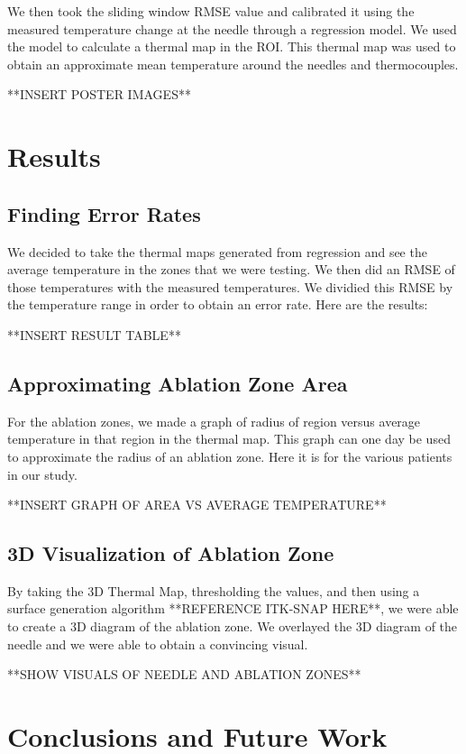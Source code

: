 \documentclass[]{spie}  %
\begin{document}
We then took the sliding window RMSE value and calibrated it using the measured temperature change at the needle through a regression model. We used the model to calculate a thermal map in the ROI. This thermal map was used to obtain an approximate mean temperature around the needles and thermocouples.

**INSERT POSTER IMAGES**


\section{Results}

\subsection{Finding Error Rates}

We decided to take the thermal maps generated from regression and see the average temperature in the zones that we were testing. We then did an RMSE of those temperatures with the measured temperatures. We dividied this RMSE by the temperature range in order to obtain an error rate. Here are the results:

**INSERT RESULT TABLE**

\subsection{Approximating Ablation Zone Area}

For the ablation zones, we made a graph of radius of region versus average temperature in that region in the thermal map. This graph can one day be used to approximate the radius of an ablation zone. Here it is for the various patients in our study. 

**INSERT GRAPH OF AREA VS AVERAGE TEMPERATURE**


\subsection{3D Visualization of Ablation Zone}

By taking the 3D Thermal Map, thresholding the values, and then using a surface generation algorithm **REFERENCE ITK-SNAP HERE**, we were able to create a 3D diagram of the ablation zone. We overlayed the 3D diagram of the needle and we were able to obtain a convincing visual. 

**SHOW VISUALS OF NEEDLE AND ABLATION ZONES**

\section{Conclusions and Future Work}
\end{document}

